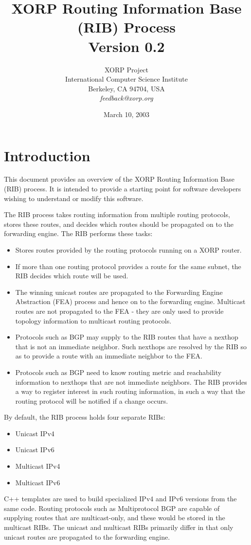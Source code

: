 \documentclass[11pt]{article}
\title{XORP Routing Information Base (RIB) Process \\
\vspace{1ex}
Version 0.2}
\author{ XORP Project					\\
	 International Computer Science Institute	\\
	 Berkeley, CA 94704, USA			\\
	 {\it feedback@xorp.org}
}
\date{March 10, 2003}
\begin{document}
\maketitle                            
\section{Introduction}
This document provides an overview of the XORP Routing Information
Base (RIB) process.  It is intended to provide a starting point for
software developers wishing to understand or modify this software.

The RIB process takes routing information from multiple routing
protocols, stores these routes, and decides which routes should be
propagated on to the forwarding engine.  The RIB performs these tasks:
\begin{itemize}
\item Stores routes provided by the routing protocols running on a
XORP router.
\item If more than one routing protocol provides a route for the same
subnet, the RIB decides which route will be used.
\item The winning unicast routes are propagated to the Forwarding
Engine Abstraction (FEA) process and hence on to the forwarding
engine.  Multicast routes are not propagated to the FEA - they are
only used to provide topology information to multicast routing
protocols.
\item Protocols such as BGP may supply to the RIB routes that have a
nexthop that is not an immediate neighbor.  Such nexthops are resolved
by the RIB so as to provide a route with an immediate neighbor to the
FEA.
\item Protocols such as BGP need to know routing metric and
reachability information to nexthops that are not immediate
neighbors.  The RIB provides a way to register interest in such
routing information, in such a way that the routing protocol will be
notified if a change occurs.
\end{itemize}
By default, the RIB process holds four separate RIBs:
\begin{itemize}
\item Unicast IPv4
\item Unicast IPv6
\item Multicast IPv4
\item Multicast IPv6
\end{itemize}
C++ templates are used to build specialized IPv4 and IPv6 versions
from the same code.  Routing protocols such as Multiprotocol BGP are
capable of supplying routes that are multicast-only, and these would
be stored in the multicast RIBs.  The unicast and multicast RIBs
primarily differ in that only unicast routes are propagated to the
forwarding engine.
\end{document}
